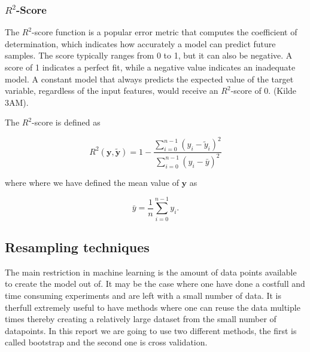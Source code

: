 \subsubsection{$R^2$-Score}

\noindent The $R^2$-score function is a popular error metric that computes the coefficient of determination, which indicates how
accurately a model can predict future samples. The score typically ranges from 0 to 1, but it can also be negative. A score of 1 indicates
a perfect fit, while a negative value indicates an inadequate model. A constant model that always predicts the expected value of the target
variable, regardless of the input features, would receive an $R^2$-score of 0. (Kilde 3AM).

\noindent The $R^2$-score is defined as 

\begin{equation}\label{eqR2} 
R^2(\boldsymbol{y}, \tilde{\boldsymbol{y}}) = 1 - \frac{\sum_{i=0}^{n - 1} (y_i - \tilde{y}_i)^2}{\sum_{i=0}^{n - 1} (y_i - \bar{y})^2}
\end{equation}

\noindent where where we have defined the mean value of $\boldsymbol{y}$ as

\begin{equation} 
\bar{y} =  \frac{1}{n} \sum_{i=0}^{n - 1} y_i.
\end{equation}



\subsection{Resampling techniques}

\noindent The main restriction in machine learning is 
the amount of data points available to create the model out of. It may be the case where one have
done a costfull and time consuming experiments and are left with a small number of data. 
It is therfull extremely useful to have methods where one can reuse the data multiple times
thereby creating a relatively large dataset from the small number of datapoints. In this report
we are going to use two different methods, the first is called bootstrap and the second one is cross validation.

